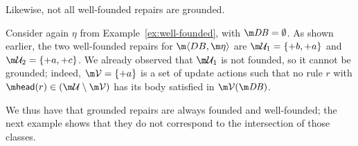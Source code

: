 Likewise, not all well-founded repairs are grounded. %
\begin{example}
  Consider again $\eta$ from Example~\ref{ex:well-founded}, with $\db=\emptyset$.
  As shown earlier, the two well-founded repairs for $\fulldb$ are $\UU_1=\{{+b},{+a}\}$ and $\UU_2=\{{+a},{+c}\}$.
  We already observed that $\UU_1$ is not founded, so it cannot be grounded; indeed,
  $\VV = \{{+a}\}$ is a set of update actions such that no rule $r$ with
  $\head(r)\in(\UU\setminus\VV)$
  has its body satisfied in $\VV(\db)$. %
\end{example}



We thus have that grounded repairs are always founded and well-founded; the next example shows that they do not correspond to the intersection of those classes.

